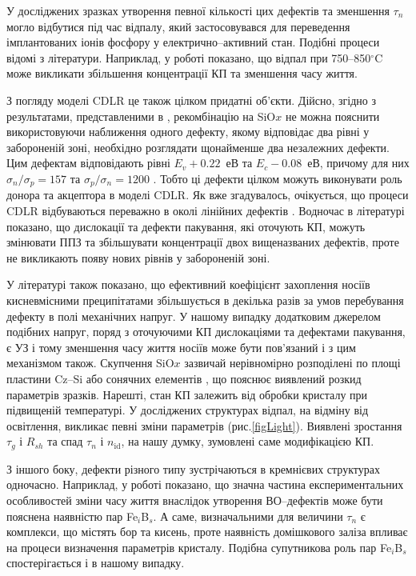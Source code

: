 У досліджених зразках утворення певної кількості цих дефектів та зменшення $\tau _n$ могло відбутися під час відпалу,
який застосовувався для переведення імплантованих іонів фосфору у електрично--активний стан.
Подібні процеси відомі з літератури.
Наприклад, у роботі \cite{SiO:Miyagi} показано, що відпал при 750--850$^\circ$C
може викликати збільшення концентрації КП та зменшення часу життя.

З погляду моделі CDLR це також цілком придатні об'єкти.
Дійсно, згідно з результатами, представленими в \cite{MurphySC2014,MurphyJAP2012},
рекомбінацію на SiO$x$ не можна пояснити використовуючи наближення одного дефекту, якому відповідає два рівні у забороненій зоні,
необхідно розглядати щонайменше два незалежних дефекти.
Цим дефектам відповідають рівні $E_v+0.22$~еВ та $E_c-0.08$~еВ, причому для них $\sigma_n/\sigma_p=157$ та $\sigma_p/\sigma_n=1200$ \cite{MurphyJAP2012}.
Тобто ці дефекти цілком можуть виконувати роль донора та акцептора в моделі CDLR.
Як вже згадувалось, очікується, що процеси CDLR відбуваються переважно в околі лінійних дефектів \cite{CDLR:JAP,CDLR:SSP}.
Водночас в літературі \cite{MurphySC2014,MurphyJAP2011,MurphyJAP2012} показано, що дислокації та дефекти пакування,
які оточують КП, можуть змінювати ППЗ та збільшувати концентрації двох вищеназваних дефектів,
проте не викликають появу  нових рівнів у забороненій зоні.

У літературі \cite{MurphyJAP2011} також показано, що ефективний коефіцієнт захоплення носіїв кисневмісними
преципітатами збільшується в декілька разів за умов перебування дефекту в полі механічних напруг.
У нашому випадку додатковим джерелом подібних напруг, поряд
з оточуючими КП дислокаціями та дефектами пакування, є УЗ і тому зменшення
часу життя носіїв може бути пов'язаний і з цим механізмом також.
Скупчення SiO$x$ зазвичай нерівномірно розподілені по площі пластини  Cz--Si \cite{Oxide_Schon} або сонячних елементів \cite{Oxide:Chen}, що пояснює виявлений розкид параметрів зразків.
Нарешті,  стан КП залежить від обробки кристалу при підвищеній температурі.
У досліджених структурах відпал, на відміну від освітлення, викликає певні зміни параметрів (рис.\ref{figLight}).
Виявлені зростання $\tau_g$ і $R_{sh}$ та спад $\tau_n$ і $n_\mathrm{id}$, на нашу думку, зумовлені саме модифікацією КП.

З іншого боку, дефекти різного типу зустрічаються в кремнієвих структурах одночасно.
Наприклад, у роботі \cite{BO:Fe} показано, що значна частина експериментальних особливостей зміни часу життя
внаслідок утворення ВО--дефектів може бути пояснена наявністю
пар  Fe$_i$B$_s$.
А саме, визначальними для величини $\tau_n$ є комплекси, що містять бор та кисень, проте
наявність домішкового заліза впливає на процеси визначення параметрів кристалу.
Подібна супутникова роль пар Fe$_i$B$_s$ спостерігається і в нашому випадку.

